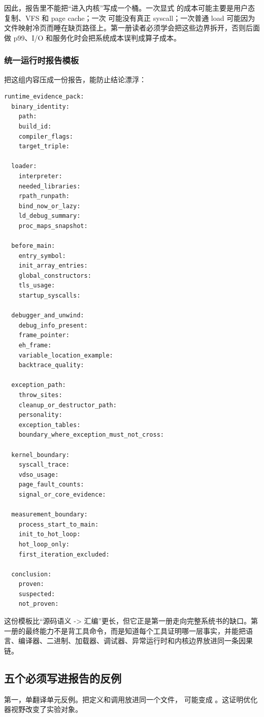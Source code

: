 因此，报告里不能把“进入内核”写成一个桶。一次显式  的成本可能主要是用户态复制、VFS 和 page cache；一次  可能没有真正 syscall；一次普通 load 可能因为文件映射冷页而睡在缺页路径上。第一册读者必须学会把这些边界拆开，否则后面做 p99、I/O 和服务化时会把系统成本误判成算子成本。

\subsubsection{统一运行时报告模板}

把这组内容压成一份报告，能防止结论漂浮：

\begin{lstlisting}[numbers=none,caption={RuntimeEvidencePack 报告模板}]
runtime_evidence_pack:
  binary_identity:
    path:
    build_id:
    compiler_flags:
    target_triple:

  loader:
    interpreter:
    needed_libraries:
    rpath_runpath:
    bind_now_or_lazy:
    ld_debug_summary:
    proc_maps_snapshot:

  before_main:
    entry_symbol:
    init_array_entries:
    global_constructors:
    tls_usage:
    startup_syscalls:

  debugger_and_unwind:
    debug_info_present:
    frame_pointer:
    eh_frame:
    variable_location_example:
    backtrace_quality:

  exception_path:
    throw_sites:
    cleanup_or_destructor_path:
    personality:
    exception_tables:
    boundary_where_exception_must_not_cross:

  kernel_boundary:
    syscall_trace:
    vdso_usage:
    page_fault_counts:
    signal_or_core_evidence:

  measurement_boundary:
    process_start_to_main:
    init_to_hot_loop:
    hot_loop_only:
    first_iteration_excluded:

  conclusion:
    proven:
    suspected:
    not_proven:
\end{lstlisting}

这份模板比“源码语义 -> 汇编”更长，但它正是第一册走向完整系统书的缺口。第一册的最终能力不是背工具命令，而是知道每个工具证明哪一层事实，并能把语言、编译器、二进制、加载器、调试器、异常运行时和内核边界放进同一条因果链。

\subsection{五个必须写进报告的反例}

第一，单翻译单元反例。把定义和调用放进同一个文件， 可能变成 。这证明优化器视野改变了实验对象。

